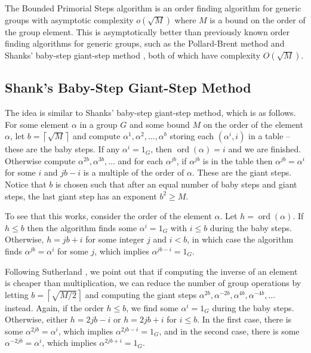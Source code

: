 \documentclass{ucalgthes1}
\theoremstyle{definition}
\DeclareMathOperator{\ord}{ord}
\newcommand{\ceil}[1]{\left\lceil #1 \right\rceil}
\begin{document}
The Bounded Primorial Steps algorithm \cite{Sutherland2007} is an order finding algorithm for generic groups with asymptotic complexity $o(\sqrt M)$ where $M$ is a bound on the order of the group element.  This is asymptotically better than previously known order finding algorithms for generic groups, such as the Pollard-Brent method \cite{Brent1980} and Shanks' baby-step giant-step method \cite{Shanks1971}, both of which have complexity $O(\sqrt M)$.

\subsection{Shank's Baby-Step Giant-Step Method}

The idea is similar to Shanks' baby-step giant-step method, which is as follows.  For some element $\alpha$ in a group $G$ and some bound $M$ on the order of the element $\alpha$, let $b = \ceil{\sqrt{M}}$ and compute $\alpha^1, \alpha^2, ..., \alpha^b$ storing each $(\alpha^i, i)$ in a table -- these are the baby steps.  If any $\alpha^i = 1_G$, then $\ord(\alpha) = i$ and we are finished.  Otherwise compute $\alpha^{2b}, \alpha^{3b}, ...$ and for each $\alpha^{jb}$, if $\alpha^{jb}$ is in the table then $\alpha^{jb} = \alpha^i$ for some $i$ and $jb - i$ is a multiple of the order of $\alpha$.  These are the giant steps.  Notice that $b$ is chosen such that after an equal number of baby steps and giant steps, the last giant step has an exponent $b^2 \ge M$.

To see that this works, consider the order of the element $\alpha$.  Let $h = \ord(\alpha)$.  If $h \le b$ then the algorithm finds some $\alpha^i = 1_G$ with $i \le b$ during the baby steps.  Otherwise, $h = jb + i$ for some integer $j$ and $i < b$, in which case the algorithm finds $\alpha^{jb} = \alpha^i$ for some $j$, which implies $\alpha^{jb-i} = 1_G$.

Following Sutherland \cite[p.50]{Sutherland2007}, we point out that if computing the inverse of an element is cheaper than multiplication, we can reduce the number of group operations by letting $b = \ceil{\sqrt{M/2}}$ and computing the giant steps $\alpha^{2b}, \alpha^{-2b}, \alpha^{4b}, \alpha^{-4b}, ...$ instead.  Again, if the order $h \le b$, we find some $\alpha^i = 1_G$ during the baby steps.  Otherwise, either $h = 2jb - i$ or $h = 2jb + i$ for $i \le b$.  In the first case, there is some $\alpha^{2jb} = \alpha^i$, which implies $\alpha^{2jb-i} = 1_G$, and in the second case, there is some $\alpha^{-2jb} = \alpha^i$, which implies $\alpha^{2jb+i} = 1_G$. 
\end{document}
